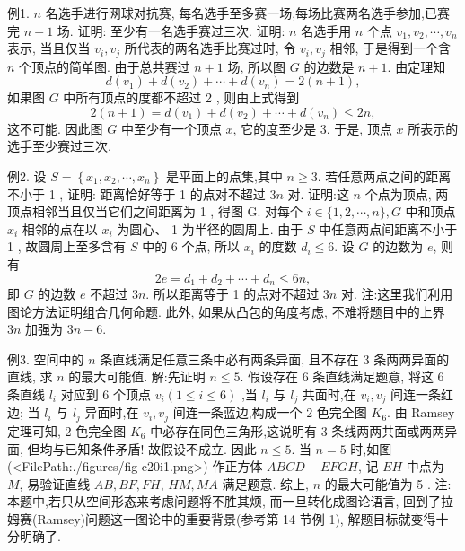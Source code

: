 例1. $n$ 名选手进行网球对抗赛, 每名选手至多赛一场,每场比赛两名选手参加,已赛完 $n+1$ 场.
证明: 至少有一名选手赛过三次.
证明: $n$ 名选手用 $n$ 个点 $v_1, v_2, \cdots, v_n$ 表示, 当且仅当 $v_i, v_j$ 所代表的两名选手比赛过时, 令 $v_i, v_j$ 相邻, 于是得到一个含 $n$ 个顶点的简单图.
由于总共赛过 $n+1$ 场, 所以图 $G$ 的边数是 $n+1$. 由定理知
$$
d\left(v_1\right)+d\left(v_2\right)+\cdots+d\left(v_n\right)=2(n+1),
$$
如果图 $G$ 中所有顶点的度都不超过 2 , 则由上式得到
$$
2(n+1)=d\left(v_1\right)+d\left(v_2\right)+\cdots+d\left(v_n\right) \leqslant 2 n,
$$
这不可能.
因此图 $G$ 中至少有一个顶点 $x$, 它的度至少是 3. 于是, 顶点 $x$ 所表示的选手至少赛过三次.



例2. 设 $S=\left\{x_1, x_2, \cdots, x_n\right\}$ 是平面上的点集,其中 $n \geqslant 3$. 若任意两点之间的距离不小于 1 , 证明: 距离恰好等于 1 的点对不超过 $3 n$ 对.
证明:这 $n$ 个点为顶点, 两顶点相邻当且仅当它们之间距离为 1 , 得图 G.
对每个 $i \in\{1,2, \cdots, n\}, G$ 中和顶点 $x_i$ 相邻的点在以 $x_i$ 为圆心、 1 为半径的圆周上.
由于 $S$ 中任意两点间距离不小于 1 , 故圆周上至多含有 $S$ 中的 6 个点, 所以 $x_i$ 的度数 $d_i \leqslant 6$.
设 $G$ 的边数为 $e$, 则有
$$
2 e=d_1+d_2+\cdots+d_n \leqslant 6 n,
$$
即 $G$ 的边数 $e$ 不超过 $3 n$. 所以距离等于 1 的点对不超过 $3 n$ 对.
注:这里我们利用图论方法证明组合几何命题.
此外, 如果从凸包的角度考虑, 不难将题目中的上界 $3 n$ 加强为 $3 n-6$.



例3. 空间中的 $n$ 条直线满足任意三条中必有两条异面, 且不存在 3 条两两异面的直线, 求 $n$ 的最大可能值.
解:先证明 $n \leqslant 5$.
假设存在 6 条直线满足题意, 将这 6 条直线 $l_i$ 对应到 6 个顶点 $v_i(1 \leqslant i \leqslant 6)$ ,当 $l_i$ 与 $l_j$ 共面时,在 $v_i, v_j$ 间连一条红边; 当 $l_i$ 与 $l_j$ 异面时,在 $v_i, v_j$ 间连一条蓝边,构成一个 2 色完全图 $K_6$. 由 Ramsey 定理可知, 2 色完全图 $K_6$ 中必存在同色三角形,这说明有 3 条线两两共面或两两异面, 但均与已知条件矛盾! 故假设不成立.
因此 $n \leqslant 5$.
当 $n=5$ 时,如图(<FilePath:./figures/fig-c20i1.png>) 作正方体 $A B C D- E F G H$, 记 $E H$ 中点为 $M$, 易验证直线 $A B, B F, F H$, $H M, M A$ 满足题意.
综上, $n$ 的最大可能值为 5 .
注:本题中,若只从空间形态来考虑问题将不胜其烦, 而一旦转化成图论语言, 回到了拉姆赛(Ramsey)问题这一图论中的重要背景(参考第 14 节例 1), 解题目标就变得十分明确了.



